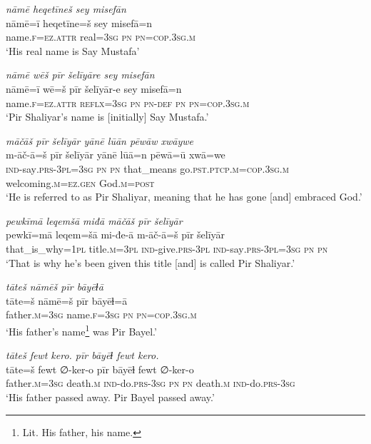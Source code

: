 \ea \label{ŽP.1}
\textit{nāmē heqetīneš sey misefān} \\ 
\gll nāmē=ī heqetīne=š sey misefā=n \\ 
 name\textsc{.f}\textsc{=ez}.\textsc{attr} real\textsc{=3sg} \textsc{pn} \textsc{pn}\textsc{=cop}\textsc{.3sg}\textsc{.m} \\ 
\glt `His real name is Say Mustafa'
\z 
 
\ea \label{ŽP.2}
\textit{nāmē wēš pīr šelīyāre sey misefān} \\ 
\gll nāmē=ī wē=š pīr šelīyār-e sey misefā=n \\ 
 name\textsc{.f}\textsc{=ez}.\textsc{attr} \textsc{reflx}\textsc{=3sg} \textsc{pn} \textsc{pn}\textsc{-def} \textsc{pn} \textsc{pn}\textsc{=cop}\textsc{.3sg}\textsc{.m} \\ 
\glt `Pir Shaliyar’s name is [initially] Say Mustafa.'
\z 
 
\ea \label{ŽP.3}
\textit{māčāš pīr šelīyār yānē lūān pēwāw xwāywe} \\ 
\gll m-āč-ā=š pīr šelīyār yānē lūā=n pēwā=ū xwā=we \\ 
 \textsc{ind-}say\textsc{.prs}\textsc{-3pl}\textsc{=3sg} \textsc{pn} \textsc{pn} that\_means go\textsc{.pst}\textsc{.ptcp}\textsc{.m}\textsc{=cop}\textsc{.3sg}\textsc{.m} welcoming\textsc{.m}\textsc{\textsc{=ez.gen}} God\textsc{.m}\textsc{=\textsc{post}} \\ 
\glt `He is referred to as Pir Shaliyar, meaning that he has gone [and] embraced God.'
\z 
 
\ea \label{ŽP.4}
\textit{pewkīmā leqemšā miđā māčāš pīr šelīyār} \\ 
\gll pewkī=mā leqem=šā mi-đe-ā m-āč-ā=š pīr šelīyār \\ 
 that\_is\_why\textsc{=1pl} title\textsc{.m}\textsc{=3pl} \textsc{ind-}give\textsc{.prs}\textsc{-3pl} \textsc{ind-}say\textsc{.prs}\textsc{-3pl}\textsc{=3sg} \textsc{pn} \textsc{pn} \\ 
\glt `That is why he’s been given this title [and] is called Pir Shaliyar.'
\z 
 
\ea \label{ŽP.5}
\textit{tāteš nāmēš pīr bāyēɫā} \\ 
\gll tāte=š nāmē=š pīr bāyēɫ=ā \\ 
 father\textsc{.m}\textsc{=3sg} name\textsc{.f}\textsc{=3sg} \textsc{pn} \textsc{pn}\textsc{=cop}\textsc{.3sg}\textsc{.m} \\ 
\glt `His father’s name\footnote{Lit. His father, his name.} was Pir Bayel.'
\z 
 
\ea \label{ŽP.8}
\textit{tāteš fewt kero. pīr bāyēɫ fewt kero.} \\ 
\gll tāte=š fewt ∅-ker-o pīr bāyēɫ fewt ∅-ker-o \\ 
 father\textsc{.m}\textsc{=3sg} death\textsc{.m} \textsc{ind-}do\textsc{.prs}\textsc{-3sg} \textsc{pn} \textsc{pn} death\textsc{.m} \textsc{ind-}do\textsc{.prs}\textsc{-3sg} \\ 
\glt `His father passed away. Pir Bayel passed away.'
\z 
 

